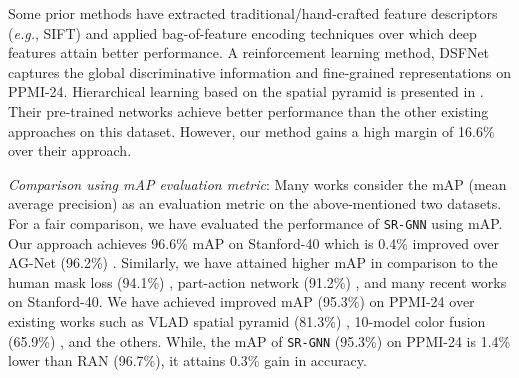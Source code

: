 \documentclass[journal]{IEEEtran}
\begin{document}
Some prior methods have extracted traditional/hand-crafted feature descriptors (\textit{e.g.}, SIFT) and applied bag-of-feature encoding techniques \cite{zhang2016towards,gao2013learning} over which deep features attain better performance. A reinforcement learning method, DSFNet \cite{li2020deep} captures the global discriminative information and fine-grained representations on PPMI-24. Hierarchical learning based on the spatial pyramid is presented in \cite{li2018reassessing}. Their pre-trained networks achieve better performance than the other existing approaches on this dataset. However, our method gains a high margin of 16.6\% over their approach.      

\noindent \textit{Comparison using mAP evaluation metric}: Many works consider the mAP (mean average precision) as an evaluation metric on the above-mentioned two datasets. For a fair comparison, we have  evaluated the performance of \texttt{SR-GNN} using mAP. Our approach achieves 96.6\% mAP on Stanford-40 which is 0.4\% improved over AG-Net (96.2\%) \cite{bera2021attend}. Similarly, we have attained higher mAP in comparison to the human mask loss (94.1\%) \cite{liu2018loss}, part-action network (91.2\%) \cite{zhao2017single}, and many recent works on Stanford-40. We have achieved improved mAP (95.3\%) on PPMI-24 over existing works such as VLAD spatial pyramid (81.3\%) \cite{yan2017action}, 10-model color fusion (65.9\%) \cite{lavinia2020new}, and the others. While, the mAP of \texttt{SR-GNN} (95.3\%) on PPMI-24 is 1.4\% lower than RAN (96.7\%), it attains 0.3\% gain in accuracy. 
\end{document}
